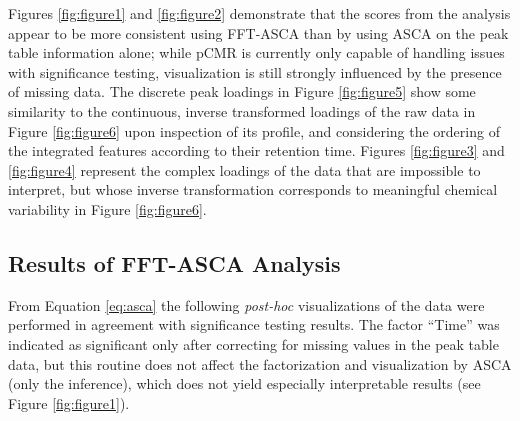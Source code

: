 \documentclass[preprint,12pt]{elsarticle}
\begin{document}
Figures \ref{fig:figure1} and \ref{fig:figure2} demonstrate that the scores from the analysis appear to be more consistent using FFT-ASCA than by using ASCA on the peak table information alone; while pCMR is currently only capable of handling issues with significance testing, visualization is still strongly influenced by the presence of missing data. The discrete peak loadings in Figure \ref{fig:figure5} show some similarity to the continuous, inverse transformed loadings of the raw data in Figure \ref{fig:figure6} upon inspection of its profile, and considering the ordering of the integrated features according to their retention time. Figures \ref{fig:figure3} and \ref{fig:figure4} represent the complex loadings of the data that are impossible to interpret, but whose inverse transformation corresponds to meaningful chemical variability in Figure \ref{fig:figure6}.

\subsection{Results of FFT-ASCA Analysis}

From Equation \ref{eq:asca} the following \textit{post-hoc} visualizations of the data were performed in agreement with significance testing results. The factor ``Time'' was indicated as significant only after correcting for missing values in the peak table data, but this routine does not affect the factorization and visualization by ASCA (only the inference), which does not yield especially interpretable results (see Figure \ref{fig:figure1}). 
\end{document}
